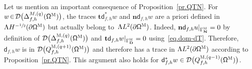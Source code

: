 \documentclass[10pt]{amsart}
\newcommand{\mbf}[1]{\mathbf{#1}}
\let\pa\partial
\theoremstyle{plain}
\theoremstyle{definition}
\begin{document}
\noindent
Let us mention an important consequence of
Proposition~\ref{pr.QTN}. For $w\!\in\! \mathcal D\bigl(\Delta_{f,h}^{M,(q)} (\mathsf \Omega^{\textsc{M}})\bigr)$, the
traces $\mathbf{t}\mathsf d^*_{f,h}w$ and $\mathbf{n} \mathsf d_{f,h}
w$ are a priori defined in $ \Lambda H^{-\sfrac12} (\pa \mathsf \Omega^{\textsc{M}})$ but actually belong
to~$ \Lambda L^{2} (\pa \mathsf \Omega^{\textsc{M}})$. Indeed,
$\mathbf{n}\mathsf d_{f,h}u|_{\Gamma^{\textsc{M}}_{\mbf N}}=0$ by
definition of $\mathcal D\bigl(\Delta_{f,h}^{\textsc{M},(q)} (\mathsf
\Omega^{\textsc{M}})\bigr)$ and $\mathbf t \mathsf
d_{f,h}w|_{\Gamma^{\textsc{M}}_{\mbf D}}=0$ using~\eqref{eq.dom-dT}. Therefore,
$\mathsf d_{f,h}w$ is in $\mathcal D\bigl(Q^{\textsc{M},(q+1)}_{f,h} (\mathsf \Omega^{\textsc{M}}) \bigr)$ and therefore has
a trace in $ \Lambda L^{2} (\partial \mathsf \Omega^{\textsc{M}})$ according to Proposition~\ref{pr.QTN}. This argument also holds for $\mathsf d^{*}_{f,h}w\in \mathcal D\bigl(Q^{\textsc{M},(q-1)}_{f,h} (\mathsf \Omega^{\textsc{M}})\bigr)$.
\end{document}
